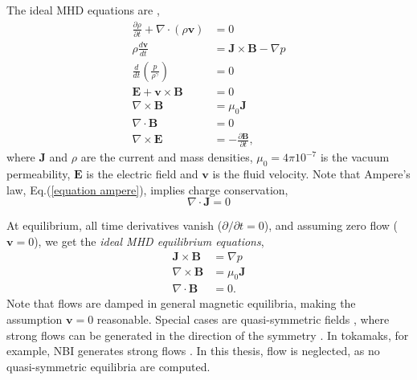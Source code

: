 \documentclass[my_thesis.tex]{subfiles}
\begin{document}
The ideal \ac{MHD} equations are \citep{Freidberg2014},
\begin{align}
	\frac{\partial \rho}{\partial t} + \nabla\cdot(\rho\mathbf{v}) &= 0 \label{mass equation}\\
	\rho\frac{d\mathbf{v}}{dt} &= \mathbf{J}\times\mathbf{B} - \nabla p \label{momentum equation}\\
	\frac{d}{dt}\left(\frac{p}{\rho^\gamma}\right) &= 0 \label{energy equation}\\
	\mathbf{E} + \mathbf{v}\times\mathbf{B} &= 0 \label{ideal Ohms law}\\
	\nabla\times\mathbf{B} &=\mu_0\mathbf{J} \label{equation ampere}\\
	\nabla\cdot\mathbf{B}&=0 \label{equation div B}\\
	\nabla\times\mathbf{E}&=-\frac{\partial \mathbf{B}}{\partial t}, \label{equation rot E}
\end{align}
where $\mathbf{J}$ and $\rho$ are the current and mass densities, $\mu_0=4\pi 10^{-7}$ is the vacuum permeability, $\mathbf{E}$ is the electric field and $\mathbf{v}$ is the fluid velocity. Note that Ampere's law, Eq.(\ref{equation ampere}), implies charge conservation,
\begin{equation}
	\nabla\cdot\mathbf{J} = 0\label{equation charge conservation}
\end{equation}

At equilibrium, all time derivatives vanish ($\partial/\partial t = 0$), and assuming zero flow ($\mathbf{v}=0$), we get the \emph{ideal MHD equilibrium equations},
\begin{align}
	\mathbf{J}\times\mathbf{B} &= \nabla p \label{equation perp force balance}\\
	\nabla\times\mathbf{B} &=\mu_0\mathbf{J}\\
	\nabla\cdot\mathbf{B}&=0.\label{equation div B ideal mhd}
\end{align}
Note that flows are damped in general magnetic equilibria, making the assumption $\mathbf{v}=0$ reasonable. Special cases are quasi-symmetric fields \citep{boozerTransportIsomorphicEquilibria1983,nuhrenbergQuasihelicallySymmetricToroidal1988,helanderTheoryPlasmaConfinement2014a,rodriguezNecessarySufficientConditions2020}, where strong flows can be generated in the direction of the symmetry \citep{spongGenerationDampingNeoclassical2005,helanderIntrinsicAmbipolarityRotation2008,simakovPlasmaRotationQuasisymmetric2011}. In tokamaks, for example, \ac{NBI} generates strong flows \citep{suckewerToroidalPlasmaRotation1979}. In this thesis, flow is neglected, as no quasi-symmetric equilibria are computed. 
\end{document}
